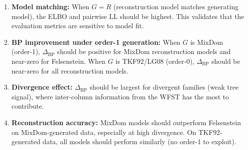 \begin{enumerate}
\item \textbf{Model matching:}
  When $G = R$ (reconstruction model matches generating model),
  the ELBO and pairwise LL should be highest.
  This validates that the evaluation metrics are sensitive to
  model fit.

\item \textbf{BP improvement under order-1 generation:}
  When $G$ is MixDom (order-1), $\Delta_{\mathrm{BP}}$ should be
  positive for MixDom reconstruction models and near-zero for
  Felsenstein.
  When $G$ is TKF92/LG08 (order-0), $\Delta_{\mathrm{BP}}$ should
  be near-zero for all reconstruction models.

\item \textbf{Divergence effect:}
  $\Delta_{\mathrm{BP}}$ should be largest for divergent families
  (weak tree signal), where inter-column information from the WFST
  has the most to contribute.

\item \textbf{Reconstruction accuracy:}
  MixDom models should outperform Felsenstein on MixDom-generated
  data, especially at high divergence.
  On TKF92-generated data, all models should perform similarly
  (no order-1 to exploit).
\end{enumerate}

